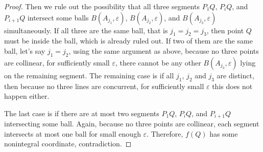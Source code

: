 \documentclass[10pt,a4paper]{amsart}
\begin{document}
\begin{proof}
	Then we rule out the possibility that all three segments
	$P_1 Q$, $P_i Q$, and $P_{i+1} Q$
	intersect some balls
	$B(A_{j_1}, \varepsilon)$,
	$B(A_{j_2}, \varepsilon)$,
	and $B(A_{j_3}, \varepsilon)$ simultaneously.
	If all three are the same ball, that is $j_1 = j_2 = j_3$, then point $Q$ must be inside the ball,
	which is already ruled out.
	If two of them are the same ball, let's say $j_1 = j_2$,
	using the same argument as above, because no three points are collinear,
	for sufficiently small $\varepsilon$,
	there cannot be any other $B(A_{j_3}, \varepsilon)$ lying on the remaining segment.
	The remaining case is if all $j_1$, $j_2$ and $j_3$ are distinct,
	then because no three lines are concurrent, for sufficiently small $\varepsilon$ this does not happen either.

	The last case is if there are at most two segments
	$P_1 Q$, $P_i Q$, and $P_{i+1} Q$
	intersecting some ball.
	Again, because no three points are collinear,
	each segment intersects at most one ball for small enough $\varepsilon$.
	Therefore, $f(Q)$ has some nonintegral coordinate, contradiction.
\end{proof}
\end{document}
